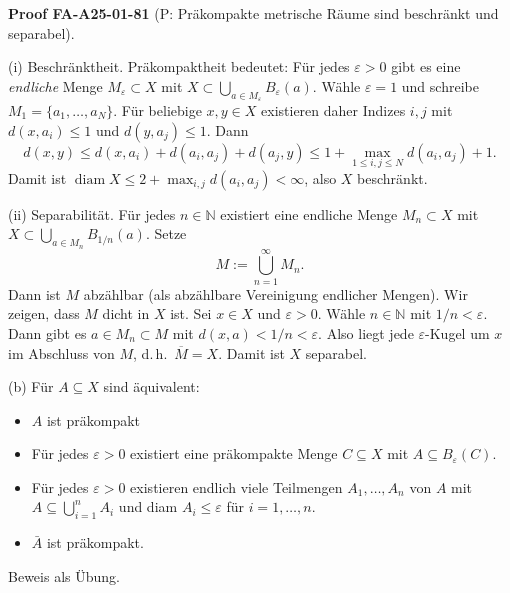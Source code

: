 \documentclass[10pt, letterpaper]{article}
\newcommand{\CustomHeading}[3]{%
  \par\medskip\noindent%
  \textbf{#1 #2} \textnormal{(#3)}.\enskip%
}
\newenvironment{PROOF}[2]{\begin{unitbox}\CustomHeading{Proof}{#1}{#2}}{\end{unitbox}}
\begin{document}
\begin{PROOF}{FA-A25-01-81}{P: Präkompakte metrische Räume sind beschränkt und separabel}
(i) Beschränktheit. Präkompaktheit bedeutet: Für jedes $\varepsilon>0$ gibt es eine \emph{endliche} Menge
$M_\varepsilon\subset X$ mit $X\subset \bigcup_{a\in M_\varepsilon} B_\varepsilon(a)$.
Wähle $\varepsilon=1$ und schreibe $M_1=\{a_1,\dots,a_N\}$.
Für beliebige $x,y\in X$ existieren daher Indizes $i,j$ mit $d(x,a_i)\le 1$ und $d(y,a_j)\le 1$. Dann
\[
d(x,y)\le d(x,a_i)+d(a_i,a_j)+d(a_j,y)\le 1+\max_{1\le i,j\le N} d(a_i,a_j)+1.
\]
Damit ist $\operatorname{diam}X\le 2+\max_{i,j} d(a_i,a_j)<\infty$, also $X$ beschränkt.

(ii) Separabilität. Für jedes $n\in\mathbb N$ existiert eine endliche Menge $M_n\subset X$
mit $X\subset \bigcup_{a\in M_n} B_{1/n}(a)$. Setze
\[
M:=\bigcup_{n=1}^\infty M_n.
\]
Dann ist $M$ abzählbar (als abzählbare Vereinigung endlicher Mengen). Wir zeigen, dass $M$ dicht in $X$ ist.
Sei $x\in X$ und $\varepsilon>0$. Wähle $n\in\mathbb N$ mit $1/n<\varepsilon$.
Dann gibt es $a\in M_n\subset M$ mit $d(x,a)<1/n<\varepsilon$.
Also liegt jede $\varepsilon$-Kugel um $x$ im Abschluss von $M$, d.\,h.\ $\overline{M}=X$.
Damit ist $X$ separabel.
\end{PROOF}



(b) Für $A \subseteq X$ sind äquivalent:

\begin{itemize}
  \item $A$ ist präkompakt
  \item Für jedes $\varepsilon>0$ existiert eine präkompakte Menge $C \subseteq X$ mit $A \subseteq B_{\varepsilon}(C)$.
  \item Für jedes $\varepsilon>0$ existieren endlich viele Teilmengen $A_{1}, \ldots, A_{n}$ von $A$ mit $A \subseteq \bigcup_{i=1}^{n} A_{i}$ und diam $A_{i} \leq \varepsilon$ für $i=1, \ldots, n$.
  \item $\bar{A}$ ist präkompakt.
\end{itemize}

Beweis als Übung.\\
\end{document}
